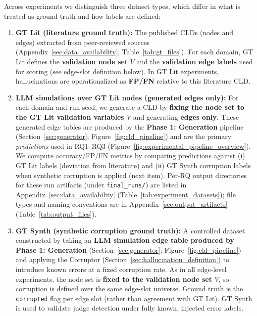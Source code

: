 Across experiments we distinguish three dataset types, which differ in what is treated as ground truth and how labels are defined:
\begin{enumerate}[noitemsep]
    \item \textbf{GT Lit (literature ground truth):} The published CLDs (nodes and edges) extracted from peer-reviewed sources (Appendix~\ref{sec:data_availability}, Table~\ref{tab:gt_files}). For each domain, GT Lit defines the \textbf{validation node set} \(V\) and the \textbf{validation edge labels} used for scoring (see edge-slot definition below). In GT Lit experiments, hallucinations are operationalized as \textbf{FP/FN} relative to this literature CLD.

    \item \textbf{LLM simulations over GT Lit nodes (generated edges only):} For each domain and run seed, we generate a CLD by \textbf{fixing the node set to the GT Lit validation variables \(V\)} and generating \textbf{edges only}. These generated edge tables are produced by the \textbf{Phase 1: Generation} pipeline (Section~\ref{sec:generator}; Figure~\ref{fig:cld_pipeline}) and are the primary \emph{predictions} used in RQ1--RQ3 (Figure~\ref{fig:experimental_pipeline_overview}). We compute accuracy/FP/FN metrics by comparing predictions against (i) GT Lit labels (deviation from literature) and (ii) GT Synth corruption labels when synthetic corruption is applied (next item). Per-RQ output directories for these run artifacts (under \texttt{final\_runs/}) are listed in Appendix~\ref{sec:data_availability} (Table~\ref{tab:experiment_datasets}); file types and naming conventions are in Appendix~\ref{sec:output_artifacts} (Table~\ref{tab:output_files}).

    \item \textbf{GT Synth (synthetic corruption ground truth):} A controlled dataset constructed by taking an \textbf{LLM simulation edge table produced by Phase 1: Generation} (Section~\ref{sec:generator}; Figure~\ref{fig:cld_pipeline}) and applying the Corruptor (Section~\ref{sec:hallucination_definition}) to introduce known errors at a fixed corruption rate. As in all edge-level experiments, the node set is \textbf{fixed to the validation node set \(V\)}, so corruption is defined over the same edge-slot universe. Ground truth is the \texttt{corrupted} flag per edge slot (rather than agreement with GT Lit). GT Synth is used to validate judge detection under fully known, injected error labels.
\end{enumerate}

